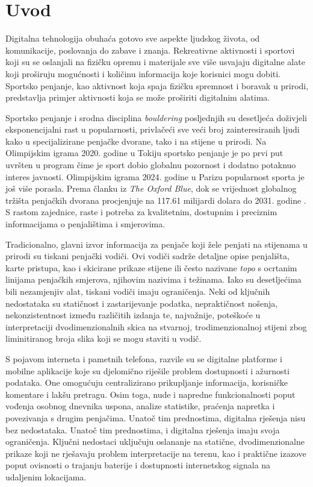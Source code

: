 \chapter{Uvod}

Digitalna tehnologija obuhaća gotovo sve aspekte ljudskog života, od komunikacije, poslovanja do zabave i znanja. Rekreativne aktivnosti i sportovi koji su se oslanjali na fizičku opremu i materijale sve više usvajaju digitalne alate koji proširuju mogućnosti i količinu informacija koje korisnici mogu dobiti. Sportsko penjanje, kao aktivnost koja spaja fizičku spremnost i boravak u prirodi, predstavlja primjer aktivnosti koja se može proširiti digitalnim alatima.

Sportsko penjanje i srodna disciplina \textit{bouldering} posljednjih su desetljeća doživjeli eksponencijalni rast u popularnosti, privlačeći sve veći broj zainteresiranih ljudi kako u specijalizirane penjačke dvorane, tako i na stijene u prirodi. Na Olimpijskim igrama 2020. godine u Tokiju sportsko penjanje je po prvi put uvršten u program čime je sport dobio globalnu pozornost i dodatno potaknuo interes javnosti. Olimpijskim igrama 2024. godine u Parizu popularnost sporta je još više porasla. Prema članku iz \textit{The Oxford Blue}, dok se vrijednost globalnog tržišta penjačkih dvorana procjenjuje na 117.61 milijardi dolara do 2031. godine \cite{the_oxford_blue_rock_climb}. S rastom zajednice, raste i potreba za kvalitetnim, dostupnim i preciznim informacijama o penjalištima i smjerovima. 

Tradicionalno, glavni izvor informacija za penjače koji žele penjati na stijenama u prirodi su tiskani penjački vodiči. Ovi vodiči sadrže detaljne opise penjališta, karte pristupa, kao i skicirane prikaze stijene ili često nazivane \textit{topo} s ocrtanim linijama penjačkih smjerova, njihovim nazivima i težinama. Iako su desetljećima bili nezamjenjiv alat, tiskani vodiči imaju ograničenja. Neki od ključnih nedostataka su statičnost i zastarijevanje podatka, nepraktičnost nošenja, nekonzistentnost između različitih izdanja te, najvažnije, poteškoće u interpretaciji dvodimenzionalnih skica na stvarnoj, trodimenzionalnoj stijeni zbog liminitiranog broja slika koji se mogu staviti u vodič.

S pojavom interneta i pametnih telefona, razvile su se digitalne platforme i mobilne aplikacije koje su djelomično riješile problem dostupnosti i ažurnosti podataka. One omogućuju centralizirano prikupljanje informacija, korisničke komentare i lakšu pretragu. Osim toga, nude i napredne funkcionalnosti poput vođenja osobnog dnevnika uspona, analize statistike, praćenja napretka i povezivanja s drugim penjačima.
Unatoč tim prednostima, digitalna rješenja nisu bez nedostataka. Unatoč tim prednostima, i digitalna rješenja imaju svoja ograničenja. Ključni nedostaci uključuju oslananje na statične, dvodimenzionalne prikaze koji ne rješavaju problem interpretacije na terenu, kao i praktične izazove poput ovisnosti o trajanju baterije i dostupnosti internetskog signala na udaljenim lokacijama.

